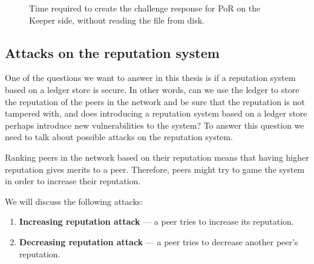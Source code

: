 \begin{figure}
  \myfloatalign
  \caption[]{Time required to create the challenge response for PoR on the Keeper side, without reading the file from disk.}
  \label{fig:por-keeper}
\end{figure}

\subsection{Attacks on the reputation system}

One of the questions we want to answer in this thesis is if a reputation system based
on a ledger store is secure.
In other words, can we use the ledger to store the reputation of the peers in the network and be sure that
the reputation is not tampered with,
and does introducing a reputation system based on a ledger store
perhaps introduce new vulnerabilities to the system?
To answer this question we need to talk about possible attacks on the reputation system.

Ranking peers in the network based on their reputation means that 
having higher reputation gives merits to a peer.
Therefore, peers might try to game the system in order to increase their reputation.

We will discuss the following attacks:
\begin{enumerate}
    \item \textbf{Increasing reputation attack} --- a peer tries to increase its reputation.
    \item \textbf{Decreasing reputation attack} --- a peer tries to decrease another peer's reputation.
\end{enumerate}

